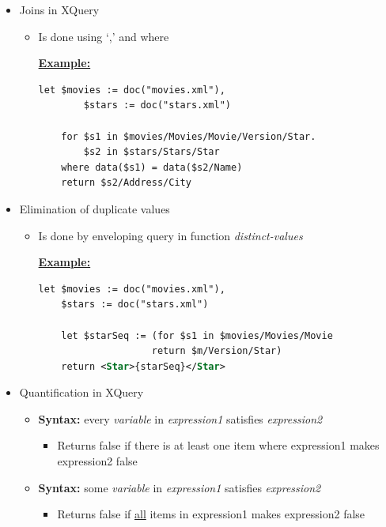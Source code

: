 \documentclass[12pt]{article}
\begin{document}
\begin{enumerate}[1.]
\begin{enumerate}[a)]
\begin{itemize}
            \item Joins in XQuery
            \begin{itemize}
                \item Is done using `,' and where

            \bigskip

            \underline{\textbf{Example:}}

            \bigskip

    \begin{lstlisting}[language=XML]
    let $movies := doc("movies.xml"),
        $stars := doc("stars.xml")

    for $s1 in $movies/Movies/Movie/Version/Star.
        $s2 in $stars/Stars/Star
    where data($s1) = data($s2/Name)
    return $s2/Address/City
    \end{lstlisting}
            \end{itemize}

            \item Elimination of duplicate values
            \begin{itemize}
                \item Is done by enveloping query in function \textit{distinct-values}

                \bigskip

                \underline{\textbf{Example:}}

                \bigskip

    \begin{lstlisting}[language=XML]
    let $movies := doc("movies.xml"),
    $stars := doc("stars.xml")

    let $starSeq := (for $s1 in $movies/Movies/Movie
                    return $m/Version/Star)
    return <Star>{starSeq}</Star>
    \end{lstlisting}
            \end{itemize}

            \item Quantification in XQuery
            \begin{itemize}
                \item \textbf{Syntax:} every \textit{variable} in \textit{expression1} satisfies \textit{expression2}
                \begin{itemize}
                    \item Returns false if there is at least one item where expression1 makes expression2 false
                \end{itemize}
                \item \textbf{Syntax:} some \textit{variable} in \textit{expression1} satisfies \textit{expression2}
                \begin{itemize}
                    \item Returns false if \underline{all} items in expression1 makes expression2 false
                \end{itemize}
            \end{itemize}


\end{itemize}
\end{enumerate}
\end{enumerate}
\end{document}
